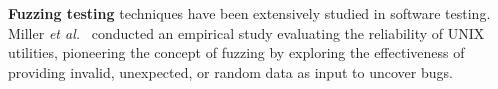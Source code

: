 






{\bf Fuzzing testing} techniques have been extensively studied in software
testing. Miller {\em et al.}~\cite{miller1995fuzz} conducted an empirical
study evaluating the reliability of UNIX utilities, pioneering the
concept of fuzzing by exploring the effectiveness of providing
invalid, unexpected, or random data as input to uncover bugs.

